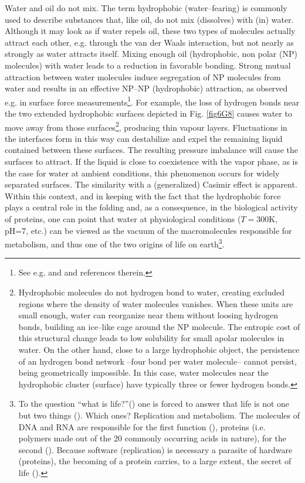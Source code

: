 \begin{subappendices}
Water and oil do not mix. The term hydrophobic (water--fearing) is commonly used to describe substances that, like oil, do not mix (dissolves) with (in) water. Although it may look as if water repels oil, these two types of molecules actually attract each other, e.g. through the van der Waals interaction, but not nearly as strongly as water attracts itself. Mixing enough oil (hydrophobic, non polar (NP) molecules) with water leads to a reduction in favorable bonding. Strong mutual attraction between water molecules induce segregation of NP molecules from water and results in an effective NP--NP (hydrophobic) attraction, as observed e.g. in surface force measurements\footnote{See e.g. \cite{Chandler:02,Chandler:05} and \cite{Lum:99} and references therein.}. For example, the loss of hydrogen bonds near the two extended hydrophobic surfaces depicted in Fig. \ref{fig6G8} causes water to move away from those surfaces\footnote{Hydrophobic molecules do not hydrogen bond to water, creating excluded regions where the density of water molecules vanishes. When these units are small enough, water can reorganize near them without loosing hydrogen bonds, building an ice--like cage around the NP molecule. The entropic cost of this structural change leads to low solubility for small apolar molecules in water. On the other hand, close to a large hydrophobic object, the persistence of an hydrogen bond network --four bond per water molecule-- cannot persist, being geometrically impossible. In this case, water molecules near the hydrophobic cluster (surface) have typically three or fewer hydrogen bonds.}, producing thin vapour layers. Fluctuations in the interfaces form in this way can destabilize and expel the remaining liquid contained between these surfaces. The resulting pressure imbalance will cause the surfaces to attract. If the liquid is close to coexistence with the vapor phase, as is the case for water at ambient conditions, this phenomenon occurs for widely separated surfaces. The similarity with a (generalized) Casimir effect is apparent. Within this context, and in keeping with the fact that the hydrophobic force plays a central role in the folding and, as a consequence, in the biological activity of proteins, one can point that water at physiological conditions ($T=$300K, pH=7, etc.) can be viewed as the vacuum of the macromolecules responsible for metabolism, and thus one of the two origins of life on earth\footnote{To the question ``what is life?''(\cite{Schrodinger:44}) one is forced to answer that life is not one but two things (\cite{Dyson:99}). Which ones? Replication and metabolism. The molecules of DNA and RNA are responsible for the first function (\cite{Watson:53,Watson:80}), proteins (i.e. polymers made out of the 20 commonly occurring acids in nature), for the second (\cite{Sanger:52}). Because software (replication) is necessary a parasite of hardware (proteins), the becoming of a protein carries, to a large extent, the secret of life (\cite{Monod:70}).}.



\end{subappendices}
